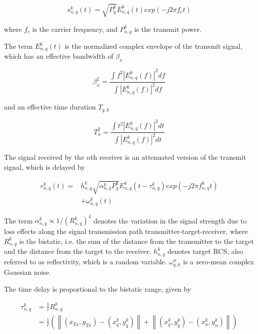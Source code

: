 \documentclass[12pt,journal,draftclsnofoot,onecolumn]{IEEEtran}
\begin{document}
\begin{equation}
    s_{n,q}^k(t)=\sqrt{P_{q}^k}E_{n,q}^k(t)exp(-j2\pi f_{c}t)
\end{equation}

where $f_{c}$ is the carrier frequency, and $P_{n,q}^k$ is the transmit power.

The term $E_{n,q}^k(t)$ is the normalized complex envelope of the transmit signal, which has an effective bandwidth of $\beta_{n}$

\begin{equation}
    \beta_{n}^2=\frac{\int f^2|E_{n,q}^k(f)|^2df}{\int |E_{n,q}^k(f)|^2df}
    \label{bandwidth}
\end{equation}

and an effective time duration $T_{q,k}$

\begin{equation}
    T_{n}^2=\frac{\int t^2|E_{n,q}^k(f)|^2dt}{\int |E_{n,q}^k(f)|^2dt}
    \label{time duration}
\end{equation}

The signal received by the $n$th receiver is an attenuated version of the transmit signal, which is delayed by

\begin{equation}
\begin{aligned}
    r_{n,q}^k(t)=&h_{n,q}^k\sqrt{\alpha_{n,q}^{k}P_{q}^k}E_{n,q}^k(t-\tau_{n,q}^k)exp(-j2\pi f_{n,q}^kt)\\
    &+\omega_{n,q}^{k}(t)
\end{aligned}
\end{equation}

The term $\alpha_{n,q}^k \propto{1/(R_{n,q}^k)^4}$ denotes the variation in the signal strength due to loss effects along the signal transmission path transmitter-target-receiver, where $R_{n,q}^k$ is the bistatic, i.e. the sum of the distance from the transmitter to the target and the distance from the target to the receiver. $h_{n,q}^k$ denotes target RCS, also referred to as reflectivity, which is a random variable. $\omega_{q,k}^n$ is a zero-mean complex Gaussian noise.

The time delay is proportional to the bistatic range, given by

\begin{equation}
\begin{aligned}
    \tau_{n,q}^k&=\frac{1}{c}R_{n,q}^k\\
    &=\frac{1}{c}(\left \|(x_{Tx},y_{Tx})-(x_q^k,y_q^k)\right \|+\left \|(x_q^k,y_q^k)-(x_n^k,y_n^k)\right \|)
\end{aligned}
\label{bistatic range}
\end{equation}
\end{document}
